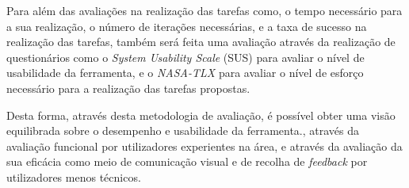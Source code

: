 Para além das avaliações na realização das tarefas como, o tempo necessário para a sua realização, o número de iterações necessárias, e a taxa de sucesso na realização das tarefas, também será feita uma avaliação através da realização de questionários como o \textit{System Usability Scale} (SUS) \cite{brooke1996sus} para avaliar o nível de usabilidade da ferramenta, e o \textit{NASA-TLX} \cite{hart1988development} para avaliar o nível de esforço necessário para a realização das tarefas propostas.

Desta forma, através desta metodologia de avaliação, é possível obter uma visão equilibrada sobre o desempenho e usabilidade da ferramenta., através da avaliação funcional por utilizadores experientes na área, e através da avaliação da sua eficácia como meio de comunicação visual e de recolha de \textit{feedback} por utilizadores menos técnicos.

